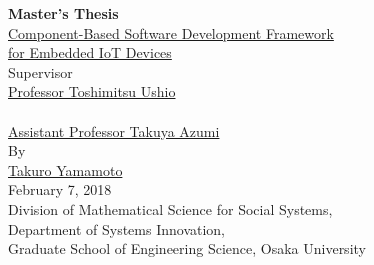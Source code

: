 \documentclass[a4j,12pt,oneside,openany,english]{jsbook}
\begin{document}
\thispagestyle{empty}
\begin{center}
\vspace*{5mm}
{\Huge {\bf Master's Thesis}}\\
\vspace{2cm}
\underline{\LARGE{Component-Based Software Development Framework}} \\
\vspace{0.5cm}
\underline{\LARGE{for Embedded IoT Devices}} \\
\vspace{12mm}
{\large Supervisor}\\
\vspace{6mm}
\underline{\Large Professor Toshimitsu Ushio}\\
　\\
\underline{\Large Assistant Professor Takuya Azumi}\\
\vspace{8mm}
{\large By}\\
\vspace{6mm}
\underline{\Large Takuro Yamamoto}\\
\vspace{10mm}
{\Large February 7, 2018}\\
\vspace{14mm}
{\Large Division of Mathematical Science for Social Systems,\\Department of Systems Innovation,\\Graduate School of Engineering Science, Osaka University}\\
\end{center}
\clearpage
\setcounter{page}{0}
\end{document}
